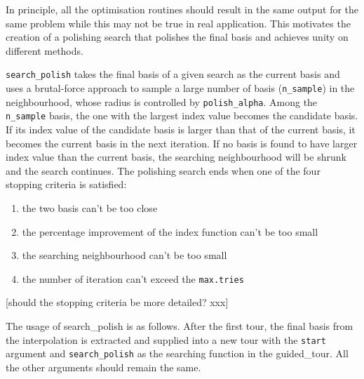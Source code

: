 \documentclass[12pt]{article}
\providecommand{\tightlist}{%
  \setlength{\itemsep}{0pt}\setlength{\parskip}{0pt}}
\begin{document}
In principle, all the optimisation routines should result in the same
output for the same problem while this may not be true in real
application. This motivates the creation of a polishing search that
polishes the final basis and achieves unity on different methods.

\texttt{search\_polish} takes the final basis of a given search as the
current basis and uses a brutal-force approach to sample a large number
of basis (\texttt{n\_sample}) in the neighbourhood, whose radius is
controlled by \texttt{polish\_alpha}. Among the \texttt{n\_sample}
basis, the one with the largest index value becomes the candidate basis.
If its index value of the candidate basis is larger than that of the
current basis, it becomes the current basis in the next iteration. If no
basis is found to have larger index value than the current basis, the
searching neighbourhood will be shrunk and the search continues. The
polishing search ends when one of the four stopping criteria is
satisfied:

\begin{enumerate}
\def\labelenumi{\arabic{enumi})}
\tightlist
\item
  the two basis can't be too close
\item
  the percentage improvement of the index function can't be too small
\item
  the searching neighbourhood can't be too small
\item
  the number of iteration can't exceed the \texttt{max.tries}
\end{enumerate}

{[}should the stopping criteria be more detailed? xxx{]}

The usage of search\_polish is as follows. After the first tour, the
final basis from the interpolation is extracted and supplied into a new
tour with the \texttt{start} argument and \texttt{search\_polish} as the
searching function in the guided\_tour. All the other arguments should
remain the same.
\end{document}
